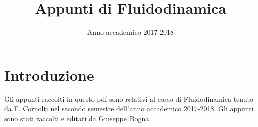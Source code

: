 \documentclass[a4paper,11pt]{report}
\title{Appunti di Fluidodinamica}
\author{Anno accademico 2017-2018}
\date{}
\theoremstyle{theorem}
\theoremstyle{definition}
\begin{document}
	\maketitle
	\section*{Introduzione}
	Gli appunti raccolti in questo pdf sono relativi al corso di Fluidodinamica tenuto da F. Cornolti nel secondo semestre dell'anno accademico 2017-2018. Gli appunti sono stati raccolti e editati da Giuseppe Bogna.
	\tableofcontents
			
\end{document}

